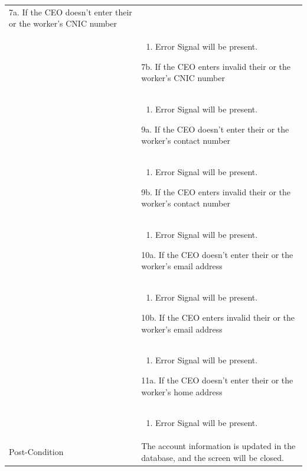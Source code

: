 \documentclass[12pt,a4paper]{article}
\begin{document}
\begin{longtable}{| p{3cm}|p{12cm}|}
7a. If the CEO doesn't enter their or the worker's CNIC number\\ 	
&	\begin{enumerate}
		\item Error Signal will be present.
	\end{enumerate}
7b. If the CEO enters invalid their or the worker's CNIC number\\ 	
&	\begin{enumerate}
		\item Error Signal will be present.
	\end{enumerate}
9a. If the CEO doesn't enter their or the worker's contact number\\ 	
&	\begin{enumerate}
		\item Error Signal will be present.
	\end{enumerate}
9b. If the CEO enters invalid their or the worker's contact number\\ 	
&	\begin{enumerate}
		\item Error Signal will be present.
	\end{enumerate}
10a. If the CEO doesn't enter their or the worker's email address\\ 	
&	\begin{enumerate}
		\item Error Signal will be present.
	\end{enumerate}
10b. If the CEO enters invalid their or the worker's email address\\ 	
&	\begin{enumerate}
		\item Error Signal will be present.
	\end{enumerate}
11a. If the CEO doesn't enter their or the worker's home address\\ 	
&	\begin{enumerate}
		\item Error Signal will be present.
	\end{enumerate}
\\ \hline
Post-Condition &  The account information is updated in the database, and the screen will be closed. \\\hline
\end{longtable}
\end{document}
